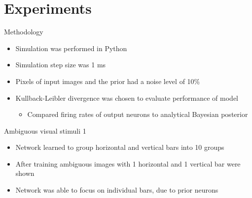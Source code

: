 \documentclass[aspectratio=169]{beamer}
\begin{document}
\section{Experiments}

\begin{frame}{Methodology}
\begin{itemize}
	\item Simulation was performed in Python
	\item Simulation step size was 1 ms
	\item Pixels of input images and the prior had a noise level of 10\%
	\item Kullback-Leibler divergence was chosen to evaluate performance of model
	\begin{itemize}
	  \item Compared firing rates of output neurons to analytical Bayesian posterior
	\end{itemize}
\end{itemize}
\end{frame}

\begin{frame}{Ambiguous visual stimuli 1}
  \begin{itemize}
    \item Network learned to group horizontal and vertical bars into 10 groups
    \item After training ambiguous images with 1 horizontal and 1 vertical bar were shown
    \item Network was able to focus on individual bars, due to prior neurons
  \end{itemize}
\end{frame}
\end{document}
